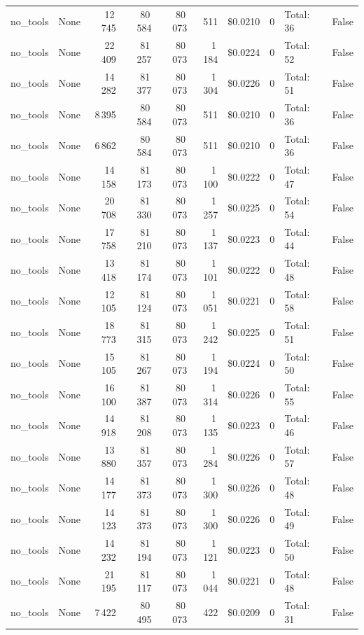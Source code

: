 \documentclass[a4paper,11pt]{article}
\begin{document}
\begin{table}[H]
{\begin{tabular}{l r r r r r r r l r}
no\_tools & None & 12\,745 & 80\,584 & 80\,073 & 511 & \$0.0210 & 0 & Total: 36 & False \\
no\_tools & None & 22\,409 & 81\,257 & 80\,073 & 1\,184 & \$0.0224 & 0 & Total: 52 & False \\
no\_tools & None & 14\,282 & 81\,377 & 80\,073 & 1\,304 & \$0.0226 & 0 & Total: 51 & False \\
no\_tools & None & 8\,395 & 80\,584 & 80\,073 & 511 & \$0.0210 & 0 & Total: 36 & False \\
no\_tools & None & 6\,862 & 80\,584 & 80\,073 & 511 & \$0.0210 & 0 & Total: 36 & False \\
no\_tools & None & 14\,158 & 81\,173 & 80\,073 & 1\,100 & \$0.0222 & 0 & Total: 47 & False \\
no\_tools & None & 20\,708 & 81\,330 & 80\,073 & 1\,257 & \$0.0225 & 0 & Total: 54 & False \\
no\_tools & None & 17\,758 & 81\,210 & 80\,073 & 1\,137 & \$0.0223 & 0 & Total: 44 & False \\
no\_tools & None & 13\,418 & 81\,174 & 80\,073 & 1\,101 & \$0.0222 & 0 & Total: 48 & False \\
no\_tools & None & 12\,105 & 81\,124 & 80\,073 & 1\,051 & \$0.0221 & 0 & Total: 58 & False \\
no\_tools & None & 18\,773 & 81\,315 & 80\,073 & 1\,242 & \$0.0225 & 0 & Total: 51 & False \\
no\_tools & None & 15\,105 & 81\,267 & 80\,073 & 1\,194 & \$0.0224 & 0 & Total: 50 & False \\
no\_tools & None & 16\,100 & 81\,387 & 80\,073 & 1\,314 & \$0.0226 & 0 & Total: 55 & False \\
no\_tools & None & 14\,918 & 81\,208 & 80\,073 & 1\,135 & \$0.0223 & 0 & Total: 46 & False \\
no\_tools & None & 13\,880 & 81\,357 & 80\,073 & 1\,284 & \$0.0226 & 0 & Total: 57 & False \\
no\_tools & None & 14\,177 & 81\,373 & 80\,073 & 1\,300 & \$0.0226 & 0 & Total: 48 & False \\
no\_tools & None & 14\,123 & 81\,373 & 80\,073 & 1\,300 & \$0.0226 & 0 & Total: 49 & False \\
no\_tools & None & 14\,232 & 81\,194 & 80\,073 & 1\,121 & \$0.0223 & 0 & Total: 50 & False \\
no\_tools & None & 21\,195 & 81\,117 & 80\,073 & 1\,044 & \$0.0221 & 0 & Total: 48 & False \\
no\_tools & None & 7\,422 & 80\,495 & 80\,073 & 422 & \$0.0209 & 0 & Total: 31 & False \\

\end{tabular}}
\end{table}
\end{document}
